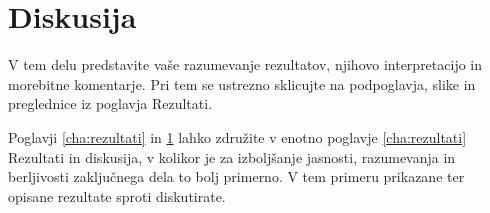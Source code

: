 \chapter{Diskusija}\label{cha:diskusija}
V tem delu predstavite vaše razumevanje rezultatov, njihovo interpretacijo in morebitne komentarje. Pri tem se ustrezno sklicujte na podpoglavja, slike in preglednice iz poglavja Rezultati.

Poglavji \ref{cha:rezultati} in \ref{cha:diskusija} lahko združite v enotno poglavje \ref{cha:rezultati} Rezultati in diskusija, v kolikor je za izboljšanje jasnosti, razumevanja in berljivosti zaključnega dela to bolj primerno. V tem primeru prikazane ter opisane rezultate sproti diskutirate.
